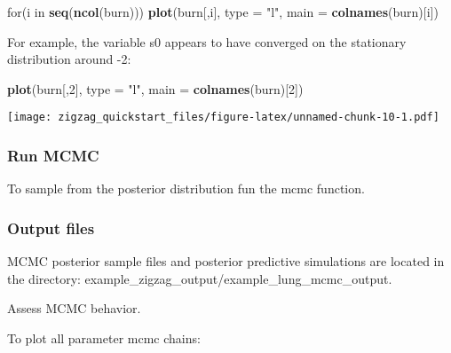 \documentclass[]{article}
\newenvironment{Shaded}{\begin{snugshade}}{\end{snugshade}}
\newcommand{\KeywordTok}[1]{\textcolor[rgb]{0.13,0.29,0.53}{\textbf{{#1}}}}
\newcommand{\DataTypeTok}[1]{\textcolor[rgb]{0.13,0.29,0.53}{{#1}}}
\newcommand{\DecValTok}[1]{\textcolor[rgb]{0.00,0.00,0.81}{{#1}}}
\newcommand{\StringTok}[1]{\textcolor[rgb]{0.31,0.60,0.02}{{#1}}}
\newcommand{\NormalTok}[1]{{#1}}
\begin{document}
\begin{Shaded}
\begin{Highlighting}[]
\NormalTok{for(i in }\KeywordTok{seq}\NormalTok{(}\KeywordTok{ncol}\NormalTok{(burn))) }\KeywordTok{plot}\NormalTok{(burn[,i], }\DataTypeTok{type =} \StringTok{"l"}\NormalTok{, }\DataTypeTok{main =} \KeywordTok{colnames}\NormalTok{(burn)[i])}
\end{Highlighting}
\end{Shaded}

For example, the variable s0 appears to have converged on the stationary
distribution around -2:

\begin{Shaded}
\begin{Highlighting}[]
\KeywordTok{plot}\NormalTok{(burn[,}\DecValTok{2}\NormalTok{], }\DataTypeTok{type =} \StringTok{"l"}\NormalTok{, }\DataTypeTok{main =} \KeywordTok{colnames}\NormalTok{(burn)[}\DecValTok{2}\NormalTok{])}
\end{Highlighting}
\end{Shaded}

\texttt{[image: zigzag\_quickstart\_files/figure-latex/unnamed-chunk-10-1.pdf]}

\subsubsection{Run MCMC}\label{run-mcmc}

To sample from the posterior distribution fun the mcmc function.

\begin{Shaded}
\end{Shaded}

\subsubsection{Output files}\label{output-files}

MCMC posterior sample files and posterior predictive simulations are
located in the directory:
example\_zigzag\_output/example\_lung\_mcmc\_output.

Assess MCMC behavior.

To plot all parameter mcmc chains:
\end{document}
